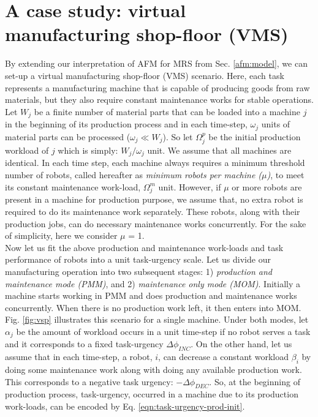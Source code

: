 \section{A case study: virtual manufacturing shop-floor (VMS)}
\label{afm:vms}
By extending our interpretation of AFM for MRS from Sec. \ref{afm:model}, we can set-up a virtual manufacturing shop-floor (VMS) scenario. Here, each task represents a manufacturing machine that is  capable of producing goods from raw materials, but they also require constant maintenance works for stable operations. Let $W_{j}$ be a finite number of material parts that can be loaded into a machine $j$ in the beginning of its production process and in each time-step, $\omega_{j}$ units of material parts can be processed  ($\omega_{j} \ll W_{j} $). So let $\Omega_{j}^{p}$ be the initial production workload of $j$ which is simply: $W_{j} / \omega_{j}$ unit. We assume that all machines are identical. In each time step, each machine always requires a minimum threshold number of robots, called hereafter as {\em minimum robots per machine ($\mu$)}, to meet its constant maintenance work-load, $\Omega_{j}^{m}$ unit. However, if $\mu$ or more robots are present in a machine for production purpose, we assume that, no extra robot is required to do its maintenance work separately. These robots, along with their production jobs, can do necessary maintenance works concurrently. For the sake of simplicity, here we consider $\mu$ = 1.\\
Now let us fit the above production and maintenance work-loads and task performance of robots into a unit task-urgency scale. Let us divide our manufacturing operation into two subsequent stages: 1) {\em production and maintenance mode (PMM)}, and 2) {\em maintenance only mode (MOM)}. Initially a machine starts working in PMM and does production and maintenance works concurrently. When there is no production work left, it then enters into MOM. Fig. \ref{fig:vsp} illustrates this scenario for a single machine.
Under both modes, let $\alpha_{j}$ be the amount of workload occurs in a unit time-step if no robot serves a task and it corresponds to a fixed task-urgency $\Delta \phi_{INC}$. On the other hand, let us assume that in each time-step, a robot, $i$, can decrease a constant workload $\beta_{i}$ by doing some maintenance work along with doing any available production work. This  corresponds to a negative task urgency: $- \Delta \phi_{DEC}$. 
So, at the beginning of production process, task-urgency, occurred in a machine due to its production work-loads, can be encoded by Eq. \ref{eqn:task-urgency-prod-init}.
